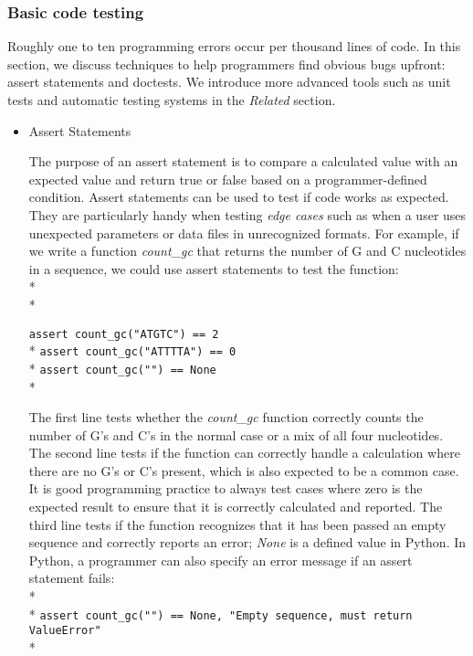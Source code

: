 \documentclass[ChapterTOCs,krantz2]{krantz} %
\begin{document}
\subsubsection{Basic code testing}

Roughly one to ten programming errors occur 
per thousand lines of code\cite{Boehm2005,Ince2012}.  
In this section, we discuss techniques to help
programmers find obvious bugs upfront: 
assert statements and doctests. We introduce more advanced
tools such as unit tests and automatic testing systems in the \emph{Related}
section.

\begin{itemize}
\item Assert Statements

The purpose of an assert statement is to compare
a calculated value with an expected value and return true or false
based on a programmer-defined condition. Assert statements can be used to
test if code works as expected.  They are
particularly handy when testing \emph{edge cases} such as when a user
uses unexpected parameters or data files in unrecognized formats.
For example, if we write a function \emph{count\_gc} that returns the number of
G and C nucleotides in a sequence, we could use assert statements to test the
function:\\* \\*

\texttt{assert count\_gc("ATGTC") == 2}\\*
\texttt{assert count\_gc("ATTTTA") == 0}\\*
\texttt{assert count\_gc("") == None}\\*

The first line tests whether the \emph{count\_gc} function correctly counts the number
of G's and C's in the normal case or a mix of all four nucleotides.  The second
line tests if the function can correctly handle a calculation where there are
no G's or C's present, which is also expected to be a common case.  It is good
programming practice to always test cases where zero is the expected result to
ensure that it is correctly calculated and reported.  The third line tests if
the function recognizes that it has been passed an empty sequence and correctly
reports an error; \emph{None} is a defined value in Python. In
Python, a programmer can also specify an error message if an assert statement
fails:\\* \\*
\texttt{assert count\_gc("") == None, "Empty sequence, must return ValueError"}\\*


\end{itemize}
\end{document}

